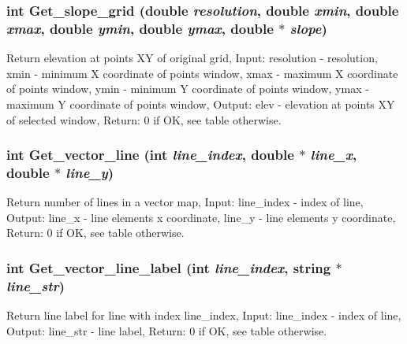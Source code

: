 \hypertarget{GisApi_8C_a81}{
\subsubsection[Get\_\-slope\_\-grid]{\setlength{\rightskip}{0pt plus 5cm}int Get\_\-slope\_\-grid (double {\em resolution}, double {\em xmin}, double {\em xmax}, double {\em ymin}, double {\em ymax}, double $\ast$ {\em slope})}}
\label{GisApi_8C_a81}


Return elevation at points XY of original grid, Input: resolution - resolution, xmin - minimum X coordinate of points window, xmax - maximum X coordinate of points window, ymin - minimum Y coordinate of points window, ymax - maximum Y coordinate of points window, Output: elev - elevation at points XY of selected window, Return: 0 if OK, see table otherwise. 

\hypertarget{GisApi_8C_a30}{
\subsubsection[Get\_\-vector\_\-line]{\setlength{\rightskip}{0pt plus 5cm}int Get\_\-vector\_\-line (int {\em line\_\-index}, double $\ast$ {\em line\_\-x}, double $\ast$ {\em line\_\-y})}}
\label{GisApi_8C_a30}


Return number of lines in a vector map, Input: line\_\-index - index of line, Output: line\_\-x - line elements x coordinate, line\_\-y - line elements y coordinate, Return: 0 if OK, see table otherwise. 

\hypertarget{GisApi_8C_a28}{
\subsubsection[Get\_\-vector\_\-line\_\-label]{\setlength{\rightskip}{0pt plus 5cm}int Get\_\-vector\_\-line\_\-label (int {\em line\_\-index}, string $\ast$ {\em line\_\-str})}}
\label{GisApi_8C_a28}


Return line label for line with index line\_\-index, Input: line\_\-index - index of line, Output: line\_\-str - line label, Return: 0 if OK, see table otherwise. 

